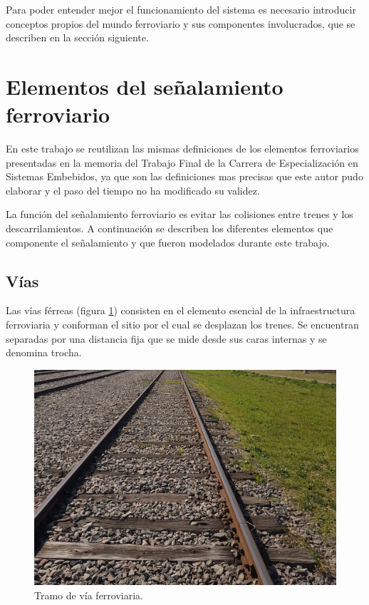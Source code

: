 		Para poder entender mejor el funcionamiento del sistema es necesario introducir conceptos propios del mundo ferroviario y sus componentes involucrados, que se describen en la sección siguiente.

	\section{Elementos del señalamiento ferroviario}
	
		En este trabajo se reutilizan las mismas definiciones de los elementos ferroviarios presentadas en la memoria del Trabajo Final de la Carrera de Especialización en Sistemas Embebidos, ya que son las definiciones mas precisas que este autor pudo elaborar y el paso del tiempo no ha modificado su validez.
		
		La función del señalamiento ferroviario es evitar las colisiones entre trenes y los descarrilamientos. A continuación se describen los diferentes elementos que componente el señalamiento y que fueron modelados durante este trabajo.
		
		\subsection{Vías}
			
			Las vías férreas (figura \ref{fig:Via_eclisa}) consisten en el elemento esencial de la infraestructura ferroviaria y conforman el sitio por el cual se desplazan los trenes. Se encuentran separadas por una distancia fija que se mide desde sus caras internas y se denomina trocha.
			
			\begin{figure}[htbp!]
				\centering
				\includegraphics[scale=.07]{./Figures/Tramo_via}
				\caption{Tramo de vía ferroviaria.}
				\label{fig:Via_eclisa}
			\end{figure}	
			
